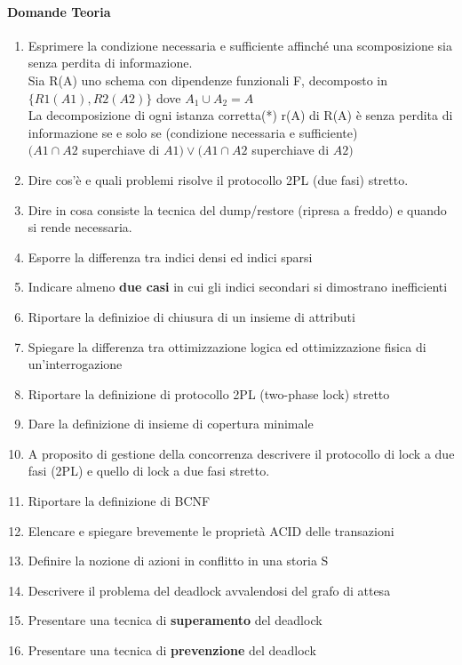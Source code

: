 \documentclass[12pt]{article}
\begin{document}
\paragraph{Domande Teoria}
\begin{enumerate}
    \item Esprimere la condizione necessaria e sufficiente affinché una scomposizione sia senza perdita di informazione. \\
    Sia R(A) uno schema con dipendenze funzionali F, decomposto in $\{R1(A1), R2(A2)\}$ dove $A_1 \cup A_2 = A$ \\
    La decomposizione di ogni istanza corretta(*) r(A) di  R(A) è senza perdita di informazione se e solo se  (condizione necessaria e sufficiente) \\  
    $(A1\cap A2$ superchiave di $A1)\vee(A1 \cap A2 $ superchiave di $A2) $
    \item Dire cos’è e quali problemi risolve il protocollo 2PL (due fasi) stretto.
    \item Dire in cosa consiste la tecnica del dump/restore (ripresa a freddo) e quando si rende necessaria.
    \item Esporre la differenza tra indici densi ed indici sparsi
    \item Indicare almeno \textbf{due casi} in cui gli indici secondari si dimostrano inefficienti
    \item Riportare la definizioe di chiusura di un insieme di attributi
    \item Spiegare la differenza tra ottimizzazione logica ed ottimizzazione fisica di un'interrogazione
    \item Riportare la definizione di protocollo 2PL (two-phase lock) stretto
    \item Dare la definizione di insieme di copertura minimale
    \item A proposito di gestione della concorrenza descrivere il protocollo di lock a due fasi (2PL) e quello di lock a due fasi stretto.
    \item Riportare la definizione di BCNF
    \item Elencare e spiegare brevemente le proprietà ACID delle transazioni
    \item Definire la nozione di azioni in conflitto in una storia S
    \item Descrivere il problema del deadlock avvalendosi del grafo di attesa
    \item Presentare una tecnica di \textbf{superamento} del deadlock
    \item Presentare una tecnica di \textbf{prevenzione} del deadlock

\end{enumerate}
\end{document}
